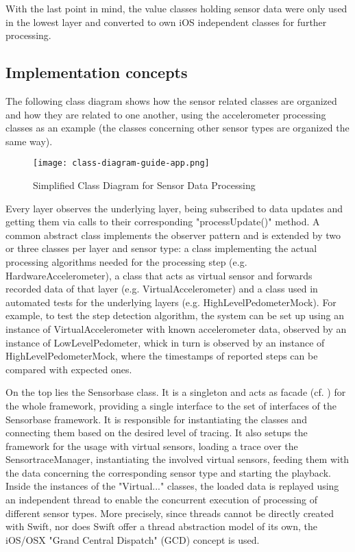 With the last point in mind, the value classes holding sensor data were only used in the lowest layer and converted to own iOS independent classes for further processing.

\subsection{Implementation concepts}

The following class diagram shows how the sensor related classes are organized and how they are related to one another, using the accelerometer processing classes as an example (the classes concerning other sensor types are organized the same way). 

\begin{figure}[H]
\centering
\texttt{[image: class-diagram-guide-app.png]}
\caption{Simplified Class Diagram for Sensor Data Processing}
\label{fig:sensorbase-classes}
\end{figure}

Every layer observes the underlying layer, being subscribed to data updates and getting them via calls to their corresponding "processUpdate()" method. A common abstract class implements the observer pattern and is extended by two or three classes per layer and sensor type: a class implementing the actual processing algorithms needed for the processing step (e.g. HardwareAccelerometer), a class that acts as virtual sensor and forwards recorded data of that layer (e.g. VirtualAccelerometer) and a class used in automated tests for the underlying layers (e.g. HighLevelPedometerMock).
For example, to test the step detection algorithm, the system can be set up using an instance of VirtualAccelerometer with known accelerometer data, observed by an instance of LowLevelPedometer, whick in turn is observed by an instance of HighLevelPedometerMock, where the timestamps of reported steps can be compared with expected ones.

On the top lies the Sensorbase class. It is a singleton and acts as facade (cf. \cite[Ch.4, Facade]{gof}) for the whole framework, providing a single interface to the set of interfaces of the Sensorbase framework. It is responsible for instantiating the classes and connecting them based on the desired level of tracing. It also setups the framework for the usage with virtual sensors, loading a trace over the SensortraceManager, instantiating the involved virtual sensors, feeding them with the data concerning the corresponding sensor type and starting the playback.
Inside the instances of the "Virtual..." classes, the loaded data is replayed using an independent thread to enable the concurrent execution of processing of different sensor types. More precisely, since threads cannot be directly created with Swift, nor does Swift offer a thread abstraction model of its own, the iOS/OSX "Grand Central Dispatch" (GCD) \cite[cf.][]{GCD-Reference} concept is used. 

